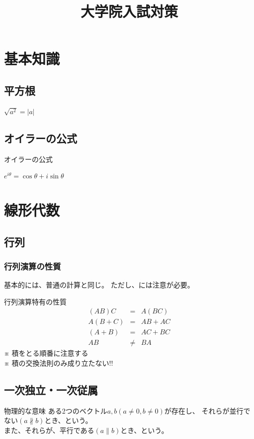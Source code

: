 \documentclass[a4paper]{jsarticle}
\author{}
\title{大学院入試対策}
\date{}
\begin{document}
\maketitle

\section{基本知識}
\subsection{平方根}
$\sqrt{a^2}=|a|$
\subsection{オイラーの公式}
\begin{itembox}[l]{オイラーの公式}
    \begin{center}
        $e^{i\theta}=\cos\theta+i\sin\theta$
    \end{center}
\end{itembox}
\newpage
\section{線形代数}
\subsection{行列}
\subsubsection{行列演算の性質}
基本的には、普通の計算と同じ。
ただし、には注意が必要。
\begin{itembox}[l]{行列演算特有の性質}
    \begin{eqnarray*}
        \left(AB\right)C&=&A\left(BC\right)\\
        A\left(B+C\right)&=&AB+AC\\
        \left(A+B\right)&=&AC+BC\\
        AB&\neq& BA
    \end{eqnarray*}
    ※ 積をとる順番に注意する\\
    ※ 積の交換法則のみ成り立たない!!
\end{itembox}
\subsection{一次独立・一次従属}
\begin{itembox}[l]{物理的な意味}
    ある2つのベクトル$a,b\left(a\neq 0,b\neq 0\right)$が存在し、
    それらが並行でない$\left(a\not\parallel b\right)$とき、という。\\
    また、それらが、平行である$\left(a\parallel b\right)$とき、という。
\end{itembox}
\end{document}
